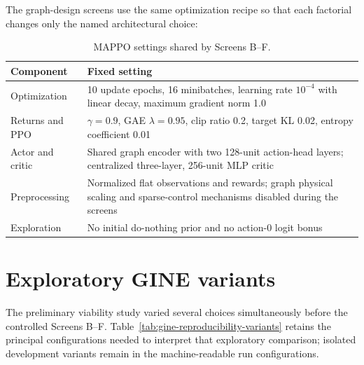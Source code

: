 {The graph-design screens use the same optimization recipe so that each
factorial changes only the named architectural choice:
\begin{table}[H]
  \color{red}
  \centering
  \small
  \caption{MAPPO settings shared by Screens B--F.}
  \label{tab:reproducibility-mappo}
  \setlength{\tabcolsep}{5pt}
  \begin{tabular}{L{0.27\textwidth}L{0.63\textwidth}}
    \toprule
    Component & Fixed setting \\
    \midrule
    Optimization
      & 10 update epochs, 16 minibatches, learning rate $10^{-4}$ with linear
        decay, maximum gradient norm 1.0 \\
    Returns and PPO
      & $\gamma=0.9$, GAE $\lambda=0.95$, clip ratio 0.2, target KL 0.02,
        entropy coefficient 0.01 \\
    Actor and critic
      & Shared graph encoder with two 128-unit action-head layers; centralized
        three-layer, 256-unit MLP critic \\
    Preprocessing
      & Normalized flat observations and rewards; graph physical scaling and
        sparse-control mechanisms disabled during the screens \\
    Exploration
      & No initial do-nothing prior and no action-0 logit bonus \\
    \bottomrule
  \end{tabular}
\end{table}

\section{Exploratory GINE variants}
\label{app:gine-viability-details}

The preliminary viability study varied several choices simultaneously before
the controlled Screens B--F. Table~\ref{tab:gine-reproducibility-variants}
retains the principal configurations needed to interpret that exploratory
comparison; isolated development variants remain in the machine-readable run
configurations.

}
